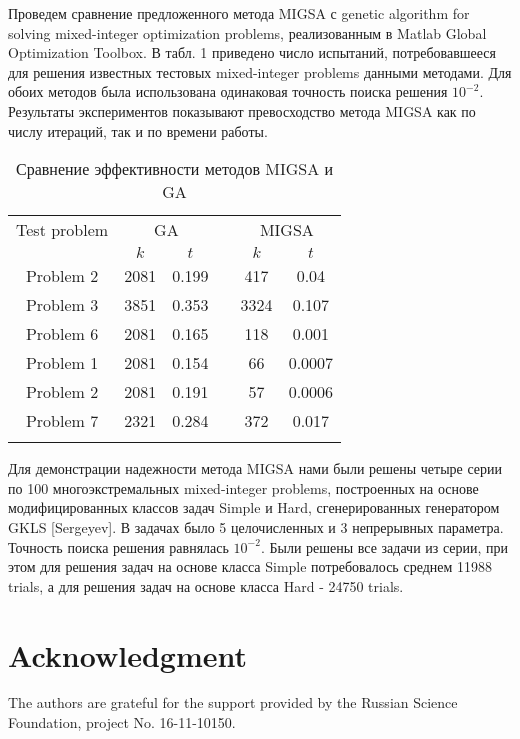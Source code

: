 \documentclass{llncs}
\begin{document}
\Russian
Проведем сравнение предложенного метода MIGSA с genetic algorithm for solving mixed-integer optimization problems, реализованным в Matlab Global Optimization Toolbox. В табл. 1 приведено число испытаний, потребовавшееся для решения известных тестовых mixed-integer problems данными методами. Для обоих методов была использована одинаковая точность поиска решения $10^{-2}$. Результаты экспериментов показывают превосходство метода MIGSA как по числу итераций, так и по времени работы.

\begin{table}
	\caption{Сравнение эффективности методов MIGSA и GA}
	\label{tab:1}
	\center
	\begin{tabular}{cccccc}
		\hline\noalign{\smallskip}
		Test problem & \multicolumn{2}{c}{ GA } & & \multicolumn{2}{c}{MIGSA} \\
		\noalign{\smallskip} \cline{2-3} \cline{5-6} \noalign{\smallskip}
		 & $k$ & $t$ & & $k$ & $t$  \\
		\noalign{\smallskip} \hline \noalign{\smallskip}
		 Problem 2 \cite{Floudas}&	2081 &	0.199 & &	417 &	0.04 \\
		 Problem 3 \cite{Floudas}& 	3851 &	0.353 & & 3324 &	0.107 \\
		 Problem 6 \cite{Floudas}&	2081 &	0.165 & &	118 &	0.001 \\
		 Problem 1 \cite{Deep}   &	2081 &	0.154 & &	66 &	0.0007 \\
		 Problem 2 \cite{Deep}   &	2081 &	0.191 & &	57 &	0.0006 \\
		 Problem 7 \cite{Deep}   &	2321 &	0.284 & & 372	 &	0.017 \\
		\noalign{\smallskip}\hline
	\end{tabular}
\end{table}

Для демонстрации надежности метода MIGSA нами были решены четыре серии по 100 многоэкстремальных mixed-integer problems, построенных на основе модифицированных классов задач Simple и Hard, сгенерированных генератором GKLS [Sergeyev]. В задачах было 5 целочисленных и 3 непрерывных параметра. Точность поиска решения равнялась $10^{-2}$. Были решены все задачи из серии, при этом для решения задач на основе класса Simple потребовалось среднем 11988 trials, а для решения задач на основе класса Hard - 24750 trials.

\section*{Acknowledgment}
The authors are grateful for the support provided by the Russian Science Foundation, project No. 16-11-10150.
\end{document}

